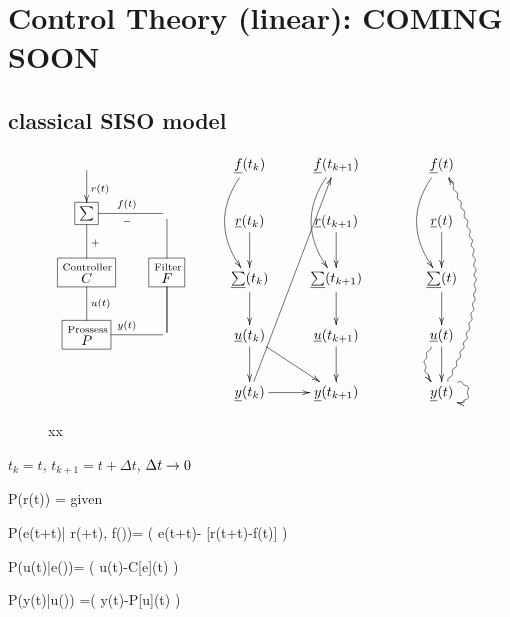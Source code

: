 \chapter{Control Theory (linear): COMING SOON}
\label{ch-control-th}

\section{classical SISO model}

\begin{figure}[h!]
$$
\begin{array}{ccc}
\xymatrix{
\ar[d]^{r(t)}
\\
*+[F]{\sum}
\ar@{-}[d]^{+}
&\ar@{-}[l]^{-}_{f(t)}
\\
*+[F]{\stackrel{\rm Controller}{C}}
\ar@{-}[d]^{u(t)}
&
*+[F]{\stackrel{\rm Filter} {F}}
\ar@{-}[u]\ar@{-}[d]
&
\\
*+[F]{\stackrel{\rm Prossess} {P}}
\ar@{-}[r]^{y(t)}
&\ar@{-}[u]
}
\xymatrix{
\rvf(t_{k})\ar@/_1.5pc/[dd]
&
\rvf(t_{k+1})\ar@/_1.5pc/[dd]
\\
\rvr(t_{k})\ar[d]
&
\rvr(t_{k+1})\ar[d]
\\
\ul{\sum}(t_{k})\ar[d]
&
\ul{\sum}(t_{k+1})\ar[d]
\\
\rvu(t_{k})\ar[d]\ar[rd]
&\rvu(t_{k+1})\ar[d]
\\
\rvy(t_{k})\ar[r]\ar[ruuuu]
&
\rvy(t_{k+1})
}
\quad\quad\quad&
\xymatrix{
\rvf(t)\ar@/_1.5pc/[dd]
\\
\rvr(t)\ar[d]
\\
\ul{\sum}(t)\ar[d]
\\
\rvu(t)\ar[d]\ar@{~>}@/_1pc/[d]
\\
\rvy(t)\ar@{~>}@/_2pc/[uuuu]
\ar@(ur,dr)@{~>}[]
}
\end{array}
$$
\caption{xx}
\label{fig-siso}
\end{figure}





$t_k=t$, $t_{k+1}=t + \Delta t$, $\Delta t\rightarrow 0$

\beq\color{blue}
P(r(t)) = given
\eeq

\beq\color{blue}
P(e(t+\Delta t)|
r(\cdot+\Delta t), f(\cdot))=
\delta(\quad
e(t+\Delta t)- [r(t+\Delta t)-f(t)]
\quad)
\eeq

\beq\color{blue}
P(u(t)|e(\cdot))=
\delta(\quad
u(t)-C[e](t)
\quad)
\eeq

\beq\color{blue}
P(y(t)|u(\cdot))
=\delta(\quad
y(t)-P[u](t)
\quad)
\eeq

